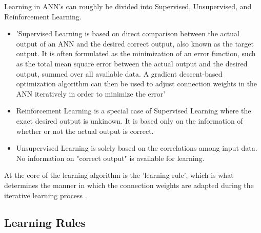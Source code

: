 Learning in ANN's can roughly be divided into Supervised, Unsupervised, and Reinforcement Learning.
\begin{itemize}
	\item 'Supervised Learning is based on direct comparison between the actual output of an ANN and the desired correct output, also known as the target output. It is often formulated as the minimization of an error function, such as the total mean square error between the actual output and the desired output, summed over all available data. A gradient descent-based optimization algorithm can then be used to adjust connection weights in the ANN iteratively in order to minimize the error'
	\item Reinforcement Learning is a special case of Supervised Learning where the exact desired output is unkinown. It is based only on the information of whether or not the actual output is correct.
	\item Unsupervised Learning is solely based on the correlations among input data. No information on "correct output" is available for learning.
\end{itemize}


At the core of the learning algorithm is the 'learning rule', which is what determines the manner in which the connection weights are adapted during the iterative learning process \cite{XinYao1999}.




\subsection{Learning Rules}

